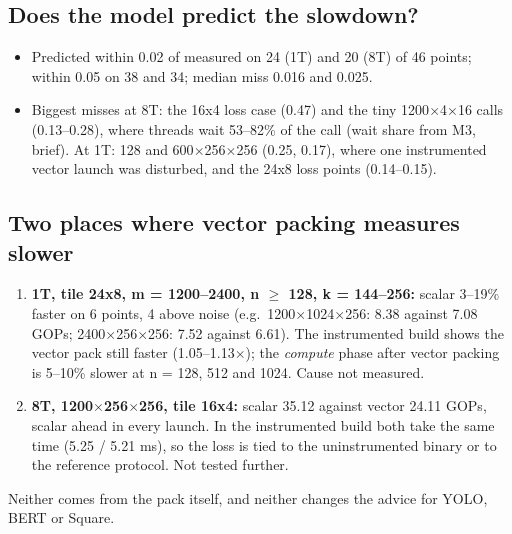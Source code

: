 \subsection{Does the model predict the slowdown?}
\begin{figure}[htbp]\centering
{}
\end{figure}
\begin{itemize}\setlength\itemsep{1pt}
\item Predicted within 0.02 of measured on 24 (1T) and 20 (8T) of 46 points; within 0.05 on 38 and 34; median miss 0.016 and 0.025.
\item Biggest misses at 8T: the 16x4 loss case (0.47) and the tiny 1200$\times$4$\times$16 calls (0.13--0.28), where threads wait 53--82\% of the call (wait share from M3,  brief). At 1T: 128 and 600$\times$256$\times$256 (0.25, 0.17), where one instrumented vector launch was disturbed, and the 24x8 loss points (0.14--0.15).
\end{itemize}

\subsection{Two places where vector packing measures slower}
\begin{enumerate}\setlength\itemsep{2pt}
\item \textbf{1T, tile 24x8, m = 1200--2400, n $\ge$ 128, k = 144--256:} scalar 3--19\% faster on 6 points, 4 above noise (e.g.\ 1200$\times$1024$\times$256: 8.38 against 7.08 GOPs; 2400$\times$256$\times$256: 7.52 against 6.61). The instrumented build shows the vector pack still faster (1.05--1.13$\times$); the \emph{compute} phase after vector packing is 5--10\% slower at n = 128, 512 and 1024. Cause not measured.
\item \textbf{8T, 1200$\times$256$\times$256, tile 16x4:} scalar 35.12 against vector 24.11 GOPs, scalar ahead in every launch. In the instrumented build both take the same time (5.25 / 5.21 ms), so the loss is tied to the uninstrumented binary or to the reference protocol. Not tested further.
\end{enumerate}
Neither comes from the pack itself, and neither changes the advice for YOLO, BERT or Square.
